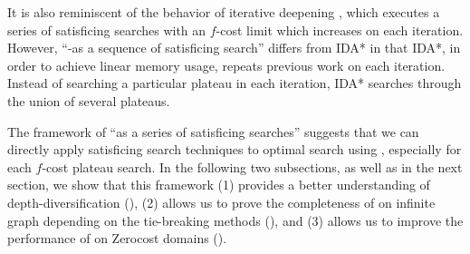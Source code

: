 % 
% 

It is also reminiscent of the behavior of iterative deepening \astar \cite{korf1985depth}, which executes a series of satisficing searches with an $f$-cost limit which increases on each iteration. However, ``\astar-as a sequence of satisficing search'' differs from IDA* in that IDA*, in order to achieve linear memory usage, repeats previous work on each iteration. Instead of searching a particular plateau in each iteration, IDA* searches through the union of several plateaus.

% 


The framework of ``\astar as a series of satisficing searches'' suggests that we can directly apply satisficing search techniques to optimal search using \astar, especially for each $f$-cost plateau search.
% 
In the following two subsections, as well as in the next section, we show that this framework  (1) provides a better understanding of depth-diversification (), (2) allows us to prove the completeness of \astar on infinite graph depending on the tie-breaking methods (), and (3) allows us to improve the performance of \astar on Zerocost domains ().


